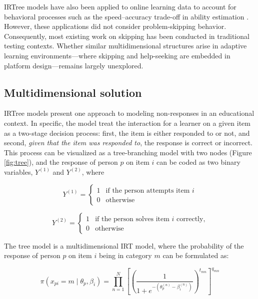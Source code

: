 \documentclass[11pt]{article}
\begin{document}
IRTree models have also been applied to online learning data to account for behavioral processes such as the speed–accuracy trade-off in ability estimation \parencite{coomans2016distinguishing, hofman2018fast}. However, these applications did not consider problem-skipping behavior. Consequently, most existing work on skipping has been conducted in traditional testing contexts. Whether similar multidimensional structures arise in adaptive learning environments---where skipping and help-seeking are embedded in platform design---remains largely unexplored. 


\subsection{Multidimensional solution}
IRTree models present one approach to modeling non-responses in an educational context. In specific, the model treat the interaction for a learner on a given item as a two-stage decision process: first, the item is either responded to or not, and second, \textit{given that the item was responded to}, the response is correct or incorrect. This process can be visualized as a tree-branching model with two nodes (Figure \ref{fig:tree}), and the response of person $p$ on item $i$ can be coded as two binary variables, $Y^{(1)}$ and $Y^{(2)}$, where 

\begin{equation}
Y^{(1)} =
\begin{cases} 
1 & \text{if the person attempts item } i \\
0 & \text{otherwise}
\end{cases}
\end{equation}

\begin{equation}
Y^{(2)} =
\begin{cases} 
1 & \text{if the person solves item } i \text{ correctly,} \\
0 & \text{otherwise}
\end{cases}
\label{eq:cases}
\end{equation}

The tree model is a multidimensional IRT model, where the probability of the response of person $p$ on item $i$ being in category $m$ can be formulated as: 

\begin{equation}
\pi(x_{pi} = m \mid \theta_p, \beta_i) = \prod_{n=1}^{N} \left[ \left( \frac{1}{1 + e^{-(\theta_p^{(n)} - \beta_i^{(n)})}} \right)^{t_{mn}} \right]^{q_{mn}}
\label{eq:tree}
\end{equation}
\end{document}
